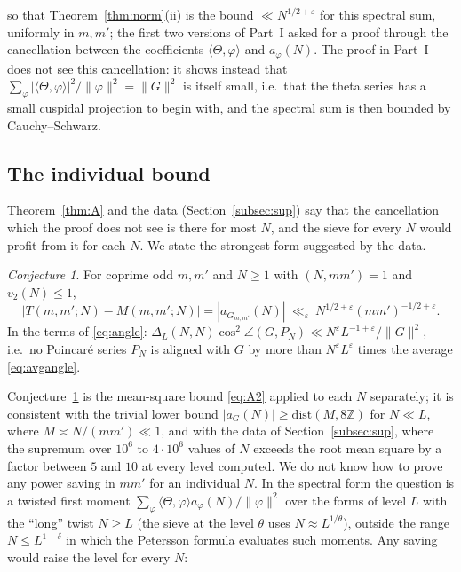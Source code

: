 ﻿\documentclass[11pt]{amsart}
\theoremstyle{remark}
\newtheorem{conjecture}[theorem]{Conjecture}
\newcommand{\Z}{\mathbb{Z}}
\newcommand{\e}{\varepsilon}
\begin{document}
so that Theorem~\ref{thm:norm}(ii) is the bound $\ll N^{1/2+\e}$ for this spectral sum, uniformly in $m,m'$; the first two versions of Part~I asked for a proof through the cancellation between the coefficients $\langle\Theta,\varphi\rangle$ and $a_\varphi(N)$. The proof in Part~I does not see this cancellation: it shows instead that $\sum_\varphi|\langle\Theta,\varphi\rangle|^2/\|\varphi\|^2=\|G\|^2$ is itself small, i.e.\ that the theta series has a small cuspidal projection to begin with, and the spectral sum is then bounded by Cauchy--Schwarz.

\subsection{The individual bound}\label{subsec:ind}
Theorem~\ref{thm:A} and the data (Section~\ref{subsec:sup}) say that the cancellation which the proof does not see is there for most $N$, and the sieve for every $N$ would profit from it for each $N$. We state the strongest form suggested by the data.

\begin{conjecture}\label{conj:ind}
For coprime odd $m,m'$ and $N\ge1$ with $(N,mm')=1$ and $v_2(N)\le1$,
\[
|T(m,m';N)-M(m,m';N)|=|a_{G_{m,m'}}(N)|\ \ll_\e\ N^{1/2+\e}(mm')^{-1/2+\e}.
\]
In the terms of \eqref{eq:angle}: $\Delta_L(N,N)\cos^2\angle(G,P_N)\ll N^\e L^{-1+\e}/\|G\|^2$, i.e.\ no Poincar\'e series $P_N$ is aligned with $G$ by more than $N^\e L^\e$ times the average \eqref{eq:avgangle}.
\end{conjecture}

Conjecture~\ref{conj:ind} is the mean-square bound \eqref{eq:A2} applied to each $N$ separately; it is consistent with the trivial lower bound $|a_G(N)|\ge\mathrm{dist}(M,8\Z)$ for $N\ll L$, where $M\asymp N/(mm')\ll1$, and with the data of Section~\ref{subsec:sup}, where the supremum over $10^6$ to $4\cdot10^6$ values of $N$ exceeds the root mean square by a factor between $5$ and $10$ at every level computed. We do not know how to prove any power saving in $mm'$ for an individual $N$. In the spectral form the question is a twisted first moment $\sum_\varphi\langle\Theta,\varphi\rangle a_\varphi(N)/\|\varphi\|^2$ over the forms of level $L$ with the ``long'' twist $N\ge L$ (the sieve at the level $\theta$ uses $N\approx L^{1/\theta}$), outside the range $N\le L^{1-\delta}$ in which the Petersson formula evaluates such moments. Any saving would raise the level for every $N$:
\end{document}
